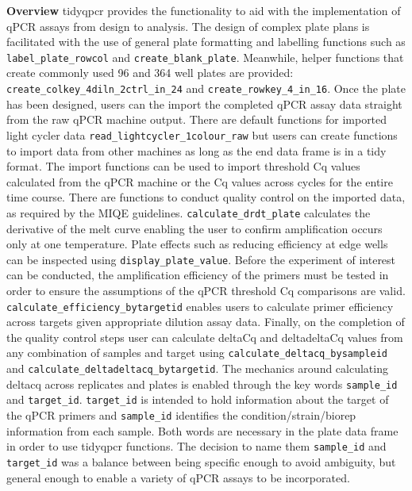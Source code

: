 \documentclass[../main.tex]{subfiles}
\begin{document}
\textbf{Overview}
tidyqpcr provides the functionality to aid with the implementation of qPCR assays from design to analysis. 
The design of complex plate plans is facilitated with the use of general plate formatting and labelling functions such as \lstinline{label_plate_rowcol} and \lstinline{create_blank_plate}. 
Meanwhile, helper functions that create commonly used 96 and 364 well plates are provided: \lstinline{create_colkey_4diln_2ctrl_in_24} and \lstinline{create_rowkey_4_in_16}. 
Once the plate has been designed, users can the import the completed qPCR assay data straight from the raw qPCR machine output. 
There are default functions for imported light cycler data \lstinline{read_lightcycler_1colour_raw} but users can create functions to import data from other machines as long as the end data frame is in a tidy format.
The import functions can be used to import threshold Cq values calculated from the qPCR  machine or the Cq values across cycles for the entire time course.
There are functions to conduct quality control on the imported data, as required by the MIQE guidelines. 
\lstinline{calculate_drdt_plate} calculates the derivative of the melt curve enabling the user to confirm amplification occurs only at one temperature.
Plate effects such as reducing efficiency at edge wells can be inspected using \lstinline{display_plate_value}.
Before the experiment of interest can be conducted, the amplification efficiency of the primers must be tested in order to ensure the assumptions of the qPCR threshold Cq comparisons are valid.
\lstinline{calculate_efficiency_bytargetid} enables users to calculate primer efficiency across targets given appropriate dilution assay data.
Finally, on the completion of the quality control steps user can calculate deltaCq and deltadeltaCq values from any combination of samples and target using \lstinline{calculate_deltacq_bysampleid} and \lstinline{calculate_deltadeltacq_bytargetid}. 
The mechanics around calculating deltacq across replicates and plates is enabled through the key words \lstinline{sample_id} and \lstinline{target_id}.
\lstinline{target_id} is intended to hold information about the target of the qPCR primers and \lstinline{sample_id} identifies the condition/strain/biorep information from each sample.
Both words are necessary in the plate data frame in order to use tidyqpcr functions. 
The decision to name them \lstinline{sample_id} and \lstinline{target_id} was a balance between being specific enough to avoid ambiguity, but general enough to enable a variety of qPCR assays to be incorporated.  
\end{document}
